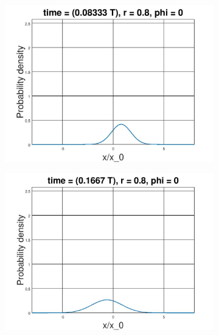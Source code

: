 \documentclass[12pt, twoside]{article}
\begin{document}
\begin{figure}[h!]
	\label{fig:squeezed_state}
	\centering
	\begin{subfigure}[h!]{0.3\linewidth}
		\includegraphics[width=\linewidth]{graphs/squeeze_0.8/1.jpg}
	\end{subfigure}
	\begin{subfigure}[h!]{0.3\linewidth}
		\includegraphics[width=\linewidth]{graphs/squeeze_0.8/2.jpg}
	\end{subfigure}
	\begin{subfigure}[h!]{0.3\linewidth}

\end{subfigure}
\end{figure}
\end{document}
